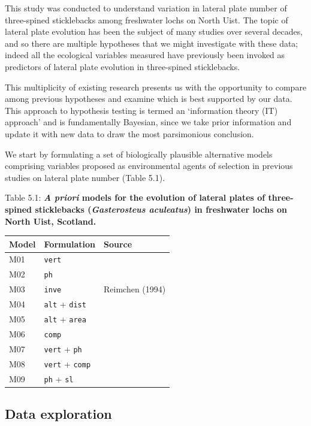 \documentclass[
]{book}
\begin{document}
This study was conducted to understand variation in lateral plate number of three-spined sticklebacks among freshwater lochs on North Uist. The topic of lateral plate evolution has been the subject of many studies over several decades, and so there are multiple hypotheses that we might investigate with these data; indeed all the ecological variables measured have previously been invoked as predictors of lateral plate evolution in three-spined sticklebacks.

This multiplicity of existing research presents us with the opportunity to compare among previous hypotheses and examine which is best supported by our data. This approach to hypothesis testing is termed an `information theory (IT) approach' and is fundamentally Bayesian, since we take prior information and update it with new data to draw the most parsimonious conclusion.

We start by formulating a set of biologically plausible alternative models comprising variables proposed as environmental agents of selection in previous studies on lateral plate number (Table 5.1).

Table 5.1: \textbf{\emph{A priori} models for the evolution of lateral plates of three-spined sticklebacks (\emph{Gasterosteus aculeatus}) in freshwater lochs on North Uist, Scotland.}

\begin{longtable}[]{@{}lll@{}}
\toprule
Model & Formulation & Source \\
\midrule
\endhead
M01 & \texttt{vert} & \citet{Morris_1956} \\
M02 & \texttt{ph} & \citet{Giles_1983} \\
M03 & \texttt{inve} & Reimchen (1994) \\
M04 & \texttt{alt} + \texttt{dist} & \citet{RAEYMAEKERS_2006} \\
M05 & \texttt{alt} + \texttt{area} & \citet{Lucek_2016} \\
M06 & \texttt{comp} & \citet{MacColl_2012} \\
M07 & \texttt{vert} + \texttt{ph} & \citet{Spence_2013} \\
M08 & \texttt{vert} + \texttt{comp} & \citet{Magalhaes_2016} \\
M09 & \texttt{ph} + \texttt{sl} & \citet{Smith_2020} \\
\bottomrule
\end{longtable}

\hypertarget{ga-eda}{%
\subsection{Data exploration}\label{ga-eda}}
\end{document}
